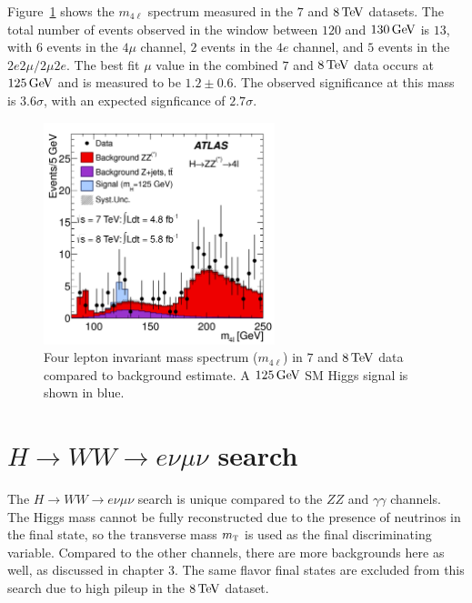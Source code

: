 Figure~\ref{fig:disc_zz_result} shows the $m_{4\ell}$ spectrum measured in the $7$ and $8 \TeV$ datasets. The total number of events observed in the window between $120$ and $130 \GeV$ is $13$, with $6$ events in the $4\mu$ channel, $2$ events in the $4e$ channel, and $5$ events in the $2e2\mu/2\mu2e$. The best fit $\mu$ value in the combined $7$ and $8 \TeV$ data occurs at $125 \GeV$ and is measured to be $1.2 \pm 0.6$. The observed significance at this mass is $3.6\sigma$, with an expected signficance of $2.7\sigma$. 

\begin{figure}[h!]
  \centering
  \captionsetup{justification=centering}
  \includegraphics[width=0.6\textwidth]{figures/discovery_m4l}
  \caption{Four lepton invariant mass spectrum ($m_{4\ell}$) in $7$ and $8 \TeV$ data compared to background estimate. A $125 \GeV$ SM Higgs signal is shown in blue\cite{Discovery}.}
  \label{fig:disc_zz_result}
\end{figure}

\section{$H\to WW \to e\nu\mu\nu$ search}

The $H\to WW \to e\nu\mu\nu$ search is unique compared to the $ZZ$ and $\gamma\gamma$ channels. The Higgs mass cannot be fully reconstructed due to the presence of neutrinos in the final state, so the transverse mass $m_{\textrm{\footnotesize\sc t}}$ is used as the final discriminating variable. Compared to the other channels, there are more backgrounds here as well, as discussed in chapter 3. The same flavor final states are excluded from this search due to high pileup in the $8 \TeV$ dataset. 

